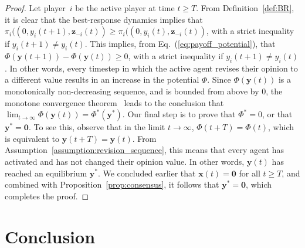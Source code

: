 \documentclass[letterpaper, 10 pt, conference]{ieeeconf}  %
\newcommand{\vect}[1]{\boldsymbol{#1}}
\newcommand{\mat}[1]{\boldsymbol{#1}}
\newtheorem{remark}{Remark}
\renewcommand{\eqref}[1]{Eq.~(\ref{#1})}  %
\begin{document}
\begin{proof}
Let player~$i$ be the active player at time $t\geq T$. From Definition~\ref{def:BR}, it is clear that the best-response dynamics implies that $\pi_i((0,y_i(t+1),\vect z_{-i}(t)) \geq \pi_i((0,y_i(t),\vect z_{-i}(t))$, with a strict inequality if $y_i(t+1) \neq y_i(t)$. This implies, from \eqref{eq:payoff_potential}, that $\Phi(\vect{y}(t+1))-\Phi(\vect{y}(t))\geq 0$, with a strict inequality if $y_i(t+1) \neq y_i(t)$. In other words, every timestep in which the active agent revises their opinion to a different value results in an increase in the potential $\Phi$. Since $\Phi(\vect y(t))$ is a monotonically non-decreasing sequence, and is bounded from above by $0$, the monotone convergence theorem~\cite{bartle1964elements} leads to the conclusion that $\lim_{t\to\infty} \Phi(\vect y(t)) = \Phi^*(\vect y^*)$. Our final step is to prove that $\Phi^* = 0$, or that $\vect y^* = \vect 0$. To see this, observe that in the limit $t\to\infty$, $\Phi(t+T) = \Phi(t)$, which is equivalent to $\vect y(t+T) = \vect y(t)$. From Assumption~\ref{assumption:revision_sequence}, this means that every agent has activated and has not changed their opinion value. In other words, $\vect y(t)$ has reached an equilibrium $\vect y^*$. We concluded earlier that $\vect x(t) = \vect 0$ for all $t\geq T$, and combined with Proposition~\ref{prop:consensus}, it follows that $\vect y^* = \vect 0$, which completes the proof.
\end{proof}


\section{Conclusion}\label{sec:conclusion}
\end{document}
